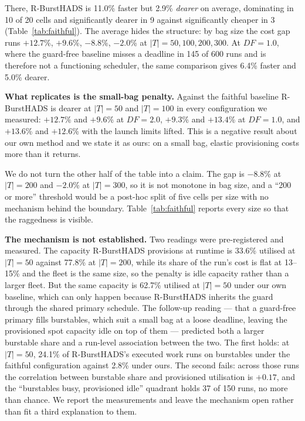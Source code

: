 \documentclass[conference]{IEEEtran}
\begin{document}
There, R-BurstHADS is 11.0\% faster but 2.9\% \emph{dearer} on average,
dominating in 10 of 20 cells and significantly dearer in 9 against
significantly cheaper in 3 (Table~\ref{tab:faithful}). The average hides the
structure: by bag size the cost gap runs $+12.7$\%, $+9.6$\%, $-8.8$\%,
$-2.0$\% at $|T| = 50, 100, 200, 300$. At $\mathit{DF} = 1.0$, where the
guard-free baseline misses a deadline in 145 of 600 runs and is therefore not
a functioning scheduler, the same comparison gives 6.4\% faster and 5.0\%
dearer.

\textbf{What replicates is the small-bag penalty.} Against the faithful
baseline R-BurstHADS is dearer at $|T| = 50$ and $|T| = 100$ in every
configuration we measured: $+12.7$\% and $+9.6$\% at $\mathit{DF} = 2.0$,
$+9.3$\% and $+13.4$\% at $\mathit{DF} = 1.0$, and $+13.6$\% and $+12.6$\% with
the launch limits lifted. This is a negative result
about our own method and we state it as ours: on a small bag, elastic
provisioning costs more than it returns.

We do not turn the other half of the table into a claim. The gap is $-8.8$\%
at $|T| = 200$ and $-2.0$\% at $|T| = 300$, so it is not monotone in bag size,
and a ``200 or more'' threshold would be a post-hoc split of five cells per
size with no mechanism behind the boundary. Table~\ref{tab:faithful} reports
every size so that the raggedness is visible.

\textbf{The mechanism is not established.} Two readings were pre-registered
and measured. The capacity R-BurstHADS provisions at runtime is 33.6\%
utilised at $|T| = 50$ against 77.8\% at $|T| = 200$, while its share of the
run's cost is flat at 13--15\% and the fleet is the same size, so the penalty
is idle capacity rather than a larger fleet. But the same capacity is 62.7\%
utilised at $|T| = 50$ under our own baseline, which can only happen because
R-BurstHADS inherits the guard through the shared primary schedule. The
follow-up reading --- that a guard-free primary fills burstables, which suit a
small bag at a loose deadline, leaving the provisioned spot capacity idle on
top of them --- predicted both a larger burstable share and a run-level
association between the two. The first holds: at $|T| = 50$, 24.1\% of
R-BurstHADS's executed work runs on burstables under the faithful
configuration against 2.8\% under ours. The second fails: across those runs
the correlation between burstable share and provisioned utilisation is
$+0.17$, and the ``burstables busy, provisioned idle'' quadrant holds 37 of
150 runs, no more than chance. We report the measurements and leave the
mechanism open rather than fit a third explanation to them.
\end{document}

